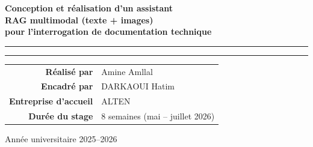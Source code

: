 \documentclass[11pt,a4paper,oneside]{report}
\begin{document}
\begin{titlepage}
\begin{center}
\vspace{9mm}
\begin{tcolorbox}[enhanced,colback=white,colframe=altenblue,boxrule=1pt,arc=2mm,
                  drop shadow={shadow xshift=1mm,shadow yshift=-1mm,opacity=0.15},
                  left=6mm,right=6mm,top=5mm,bottom=5mm]
\centering
{\sffamily\bfseries\LARGE\color{inkgray}
Conception et réalisation d'un assistant\\[1.5mm]
RAG multimodal (texte + images)\\[1.5mm]
pour l'interrogation de documentation technique}\\[4mm]
{\sffamily\color{altenred}\rule{2.2cm}{1.2pt}}\hspace{1mm}%
{\sffamily\color{altengold}\rule{0.8cm}{1.2pt}}
\end{tcolorbox}

\vspace{11mm}
{\sffamily\renewcommand{\arraystretch}{1.5}
\begin{tabular}{r@{\hspace{6mm}}l}
\textcolor{altenbluedark}{\bfseries Réalisé par} & Amine Amllal \\
\textcolor{altenbluedark}{\bfseries Encadré par} & DARKAOUI Hatim \\
\textcolor{altenbluedark}{\bfseries Entreprise d'accueil} & ALTEN \\
\textcolor{altenbluedark}{\bfseries Durée du stage} & 8 semaines (mai -- juillet 2026) \\
\end{tabular}}

\vfill
{\sffamily\color{inkgray} Année universitaire 2025--2026}
\vspace*{8mm}
\end{center}
\end{titlepage}




\cleardoublepage
{}
\tableofcontents

\cleardoublepage
{}
\listoffigures

\cleardoublepage
{}
\listoftables



\cleardoublepage
{}










\end{document}
